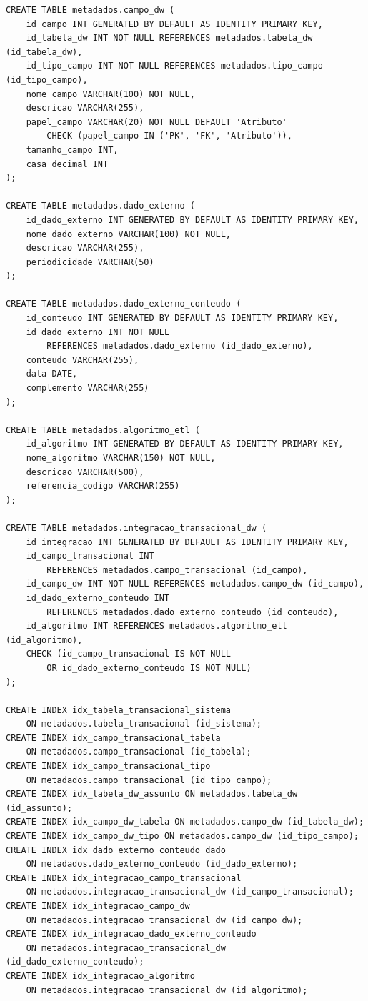 {\begin{verbatim}
CREATE TABLE metadados.campo_dw (
    id_campo INT GENERATED BY DEFAULT AS IDENTITY PRIMARY KEY,
    id_tabela_dw INT NOT NULL REFERENCES metadados.tabela_dw (id_tabela_dw),
    id_tipo_campo INT NOT NULL REFERENCES metadados.tipo_campo (id_tipo_campo),
    nome_campo VARCHAR(100) NOT NULL,
    descricao VARCHAR(255),
    papel_campo VARCHAR(20) NOT NULL DEFAULT 'Atributo'
        CHECK (papel_campo IN ('PK', 'FK', 'Atributo')),
    tamanho_campo INT,
    casa_decimal INT
);

CREATE TABLE metadados.dado_externo (
    id_dado_externo INT GENERATED BY DEFAULT AS IDENTITY PRIMARY KEY,
    nome_dado_externo VARCHAR(100) NOT NULL,
    descricao VARCHAR(255),
    periodicidade VARCHAR(50)
);

CREATE TABLE metadados.dado_externo_conteudo (
    id_conteudo INT GENERATED BY DEFAULT AS IDENTITY PRIMARY KEY,
    id_dado_externo INT NOT NULL
        REFERENCES metadados.dado_externo (id_dado_externo),
    conteudo VARCHAR(255),
    data DATE,
    complemento VARCHAR(255)
);

CREATE TABLE metadados.algoritmo_etl (
    id_algoritmo INT GENERATED BY DEFAULT AS IDENTITY PRIMARY KEY,
    nome_algoritmo VARCHAR(150) NOT NULL,
    descricao VARCHAR(500),
    referencia_codigo VARCHAR(255)
);

CREATE TABLE metadados.integracao_transacional_dw (
    id_integracao INT GENERATED BY DEFAULT AS IDENTITY PRIMARY KEY,
    id_campo_transacional INT
        REFERENCES metadados.campo_transacional (id_campo),
    id_campo_dw INT NOT NULL REFERENCES metadados.campo_dw (id_campo),
    id_dado_externo_conteudo INT
        REFERENCES metadados.dado_externo_conteudo (id_conteudo),
    id_algoritmo INT REFERENCES metadados.algoritmo_etl (id_algoritmo),
    CHECK (id_campo_transacional IS NOT NULL
        OR id_dado_externo_conteudo IS NOT NULL)
);

CREATE INDEX idx_tabela_transacional_sistema
    ON metadados.tabela_transacional (id_sistema);
CREATE INDEX idx_campo_transacional_tabela
    ON metadados.campo_transacional (id_tabela);
CREATE INDEX idx_campo_transacional_tipo
    ON metadados.campo_transacional (id_tipo_campo);
CREATE INDEX idx_tabela_dw_assunto ON metadados.tabela_dw (id_assunto);
CREATE INDEX idx_campo_dw_tabela ON metadados.campo_dw (id_tabela_dw);
CREATE INDEX idx_campo_dw_tipo ON metadados.campo_dw (id_tipo_campo);
CREATE INDEX idx_dado_externo_conteudo_dado
    ON metadados.dado_externo_conteudo (id_dado_externo);
CREATE INDEX idx_integracao_campo_transacional
    ON metadados.integracao_transacional_dw (id_campo_transacional);
CREATE INDEX idx_integracao_campo_dw
    ON metadados.integracao_transacional_dw (id_campo_dw);
CREATE INDEX idx_integracao_dado_externo_conteudo
    ON metadados.integracao_transacional_dw (id_dado_externo_conteudo);
CREATE INDEX idx_integracao_algoritmo
    ON metadados.integracao_transacional_dw (id_algoritmo);
\end{verbatim}
}
